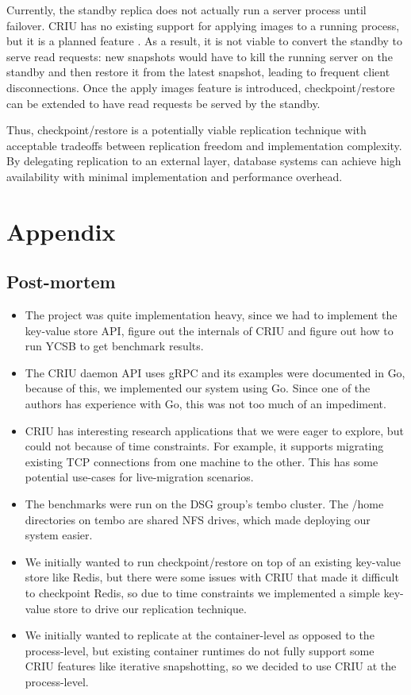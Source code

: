 \documentclass[final]{proc}
\begin{document}
Currently, the standby replica does not actually run a server process until
failover. CRIU has no existing support for applying images to a running process,
but it is a planned feature \cite{CRIUApply}. As a result, it is not viable to
convert the standby to serve read requests: new snapshots would have to kill the
running server on the standby and then restore it from the latest snapshot,
leading to frequent client disconnections. Once the apply images feature is
introduced, checkpoint/restore can be extended to have read requests be served
by the standby.

Thus, checkpoint/restore is a potentially viable replication technique with
acceptable tradeoffs between replication freedom and implementation complexity.
By delegating replication to an external layer, database systems can achieve
high availability with minimal implementation and performance overhead.

\printbibliography

\section{Appendix}

\subsection{Post-mortem}

\begin{itemize}
  \item The project was quite implementation heavy, since we had to implement
  the key-value store API, figure out the internals of CRIU and figure out how to
  run YCSB to get benchmark results.
  \item The CRIU daemon API uses gRPC and its examples were documented in Go,
  because of this, we implemented our system using Go. Since one of the authors
  has experience with Go, this was not too much of an impediment.
  \item CRIU has interesting research applications that we were eager to
  explore, but could not because of time constraints. For example, it supports
  migrating existing TCP connections from one machine to the other. This has
  some potential use-cases for live-migration scenarios.
  \item The benchmarks were run on the DSG group's tembo cluster. The /home
  directories on tembo are shared NFS drives, which made deploying our system
  easier.
  \item We initially wanted to run checkpoint/restore on top of an existing
  key-value store like Redis, but there were some issues with CRIU that made it
  difficult to checkpoint Redis, so due to time constraints we implemented a
  simple key-value store to drive our replication technique.
  \item We initially wanted to replicate at the container-level as opposed
  to the process-level, but existing container runtimes do not fully support
  some CRIU features like iterative snapshotting, so we decided to use
  CRIU at the process-level.
\end{itemize}
\end{document}

